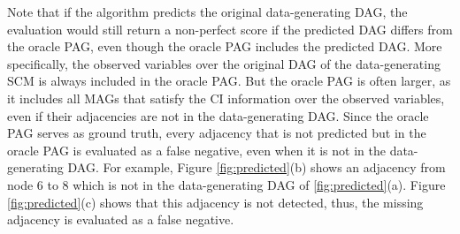 \documentclass[conference]{IEEEtran}
\begin{document}
Note that if the algorithm predicts the original data-generating DAG, the evaluation would still return a non-perfect score if the predicted DAG differs from the oracle PAG, even though the oracle PAG includes the predicted DAG. More specifically, the observed variables over the original DAG of the data-generating SCM is always included in the oracle PAG. But the oracle PAG is often larger, as it includes all MAGs that satisfy the CI information over the observed variables, even if their adjacencies are not in the data-generating DAG. Since the oracle PAG serves as ground truth, every adjacency that is not predicted but in the oracle PAG is evaluated as a false negative, even when it is not in the data-generating DAG.
For example, Figure \ref{fig:predicted}(b) shows an adjacency from node 6 to 8 which is not in the data-generating DAG of \ref{fig:predicted}(a). Figure \ref{fig:predicted}(c) shows that this adjacency is not detected, thus, the missing adjacency is evaluated as a false negative.
\end{document}
